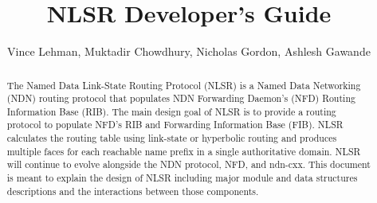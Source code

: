 \documentclass[10pt]{article}
\title{NLSR Developer's Guide}
\author[1]{Vince Lehman, Muktadir Chowdhury, Nicholas Gordon, Ashlesh Gawande}
\affil[1]{University of Memphis}
\begin{document}
\maketitle

\begin{abstract}
The Named Data Link-State Routing Protocol (NLSR) is a Named Data Networking (NDN) routing protocol that populates NDN Forwarding Daemon's (NFD) Routing Information Base (RIB).
The main design goal of NLSR is to provide a routing protocol to populate NFD's RIB and Forwarding Information Base (FIB).
NLSR calculates the routing table using link-state or hyperbolic routing and produces multiple faces for each reachable name prefix in a single authoritative domain.
NLSR will continue to evolve alongside the NDN protocol, NFD, and ndn-cxx.
This document is meant to explain the design of NLSR including major module and data structures descriptions and the interactions between those components.

\end{abstract}

\tableofcontents
\clearpage


\clearpage

\clearpage

\clearpage

\clearpage

\clearpage

\clearpage

\clearpage

\clearpage
%
%
%

\clearpage

\clearpage

{}



\end{document}
